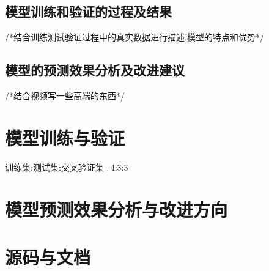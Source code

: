 \documentclass[a4paper,12pt]{ctexart}
\begin{document}
\subsection{模型训练和验证的过程及结果}
/*结合训练测试验证过程中的真实数据进行描述,模型的特点和优势*/

\subsection{模型的预测效果分析及改进建议}
/*结合视频写一些高端的东西*/















\section{模型训练与验证}
训练集:测试集:交叉验证集=4:3:3


\section{模型预测效果分析与改进方向}
\section{源码与文档}
\end{document}
